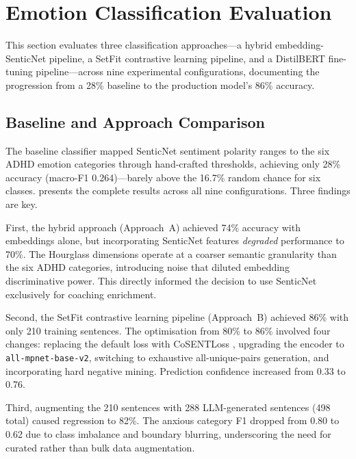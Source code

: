\section{Emotion Classification Evaluation}
\label{sec:emotion-evaluation}

This section evaluates three classification approaches---a hybrid embedding-SenticNet pipeline, a SetFit contrastive learning pipeline, and a DistilBERT fine-tuning pipeline---across nine experimental configurations, documenting the progression from a 28\% baseline to the production model's 86\% accuracy.

\subsection{Baseline and Approach Comparison}
\label{subsec:baseline-comparison}

The baseline classifier mapped SenticNet sentiment polarity ranges to the six ADHD emotion categories through hand-crafted thresholds, achieving only 28\% accuracy (macro-F1 0.264)---barely above the 16.7\% random chance for six classes.  presents the complete results across all nine configurations. Three findings are key.

First, the hybrid approach (Approach~A) achieved 74\% accuracy with embeddings alone, but incorporating SenticNet features \emph{degraded} performance to 70\%. The Hourglass dimensions operate at a coarser semantic granularity than the six ADHD categories, introducing noise that diluted embedding discriminative power. This directly informed the decision to use SenticNet exclusively for coaching enrichment.

Second, the SetFit contrastive learning pipeline (Approach~B) achieved 86\% with only 210 training sentences. The optimisation from 80\% to 86\% involved four changes: replacing the default loss with CoSENTLoss \cite{reimers2019}, upgrading the encoder to \texttt{all-mpnet-base-v2}, switching to exhaustive all-unique-pairs generation, and incorporating hard negative mining. Prediction confidence increased from 0.33 to 0.76.

Third, augmenting the 210 sentences with 288 LLM-generated sentences (498 total) caused regression to 82\%. The anxious category F1 dropped from 0.80 to 0.62 due to class imbalance and boundary blurring, underscoring the need for curated rather than bulk data augmentation.

